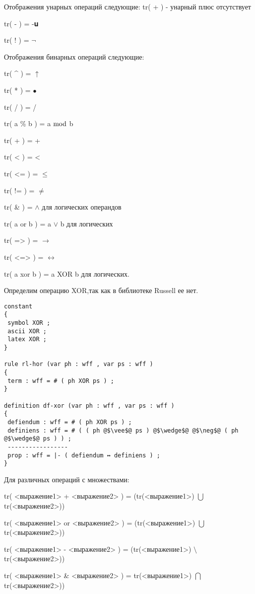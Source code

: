 \documentclass[10pt,a4paper]{article}
\begin{document}
Отображения унарных операций следующие:
tr( + )  - унарный плюс отсутствует

tr( - )  = -𝐮

tr( ! )  =  $\neg$

\begin{flushleft}
Отображения бинарных операций следующие:

tr( \textbf{\^} )  =  $ \uparrow $

tr( * )  = $ \bullet $

tr( / )  = /

tr( a \% b )  = a $\rm{mod}$ b

tr( + )  =  +

tr( < )  =  <

tr( <= )  = $\leqslant$

tr( != )  =  $\neq $

tr( \& )  =  $\wedge$ для логических операндов

tr( a or b )  =  a $\vee$ b для логических

tr( => )  =  $\rightarrow$

tr( <=> )  =  $\leftrightarrow$

tr( a xor b )  =  a XOR b для логических.

Определим операцию XOR,так как в библиотеке Russell ее нет.
\begin{flushleft}
\begin{lstlisting}
constant
{
 symbol XOR ;
 ascii XOR ;
 latex XOR ;
}

rule rl-hor (var ph : wff , var ps : wff )
{
 term : wff = # ( ph XOR ps ) ;
}

definition df-xor (var ph : wff , var ps : wff )
{
 defiendum : wff = # ( ph XOR ps ) ;
 definiens : wff = # ( ( ph @$\vee$@ ps ) @$\wedge$@ @$\neg$@ ( ph @$\wedge$@ ps ) ) ;
 -----------------
 prop : wff = |- ( defiendum ↔ definiens ) ;
}
\end{lstlisting}
\end{flushleft}
\end{flushleft}
Для различных операций с множествами:

tr( <выражение1> + <выражение2> )  =  (tr(<выражение1>) $\bigcup$ tr(<выражение2>))

tr( <выражение1> or <выражение2> )  =  (tr(<выражение1>) $\bigcup$ tr(<выражение2>))

tr( <выражение1> - <выражение2> )  = (tr(<выражение1>) $\setminus $ tr(<выражение2>))

tr( <выражение1> \& <выражение2> )  =  tr(<выражение1>) $\bigcap$  tr(<выражение2>))
\end{document}
